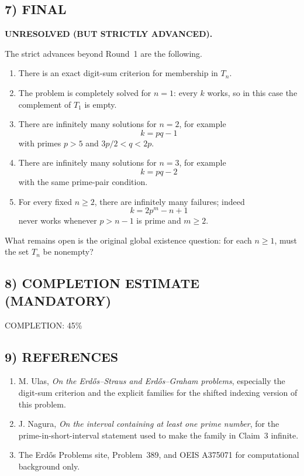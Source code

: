 \subsection*{7) FINAL}

\textbf{UNRESOLVED (BUT STRICTLY ADVANCED).}

The strict advances beyond Round~1 are the following.

\begin{enumerate}
\item There is an exact digit-sum criterion for membership in $T_n$.

\item The problem is completely solved for $n=1$: every $k$ works, so in this case the complement of $T_1$ is empty.

\item There are infinitely many solutions for $n=2$, for example
\[
k=pq-1
\]
with primes $p>5$ and $3p/2<q<2p$.

\item There are infinitely many solutions for $n=3$, for example
\[
k=pq-2
\]
with the same prime-pair condition.

\item For every fixed $n\ge 2$, there are infinitely many failures; indeed
\[
k=2p^m-n+1
\]
never works whenever $p>n-1$ is prime and $m\ge 2$.
\end{enumerate}

What remains open is the original global existence question:
for each $n\ge 1$, must the set $T_n$ be nonempty?

\subsection*{8) COMPLETION ESTIMATE (MANDATORY)}

COMPLETION: 45\%

\subsection*{9) REFERENCES}

\begin{enumerate}
\item M. Ulas, \emph{On the Erd\H{o}s--Straus and Erd\H{o}s--Graham problems}, especially the digit-sum criterion and the explicit families for the shifted indexing version of this problem.

\item J. Nagura, \emph{On the interval containing at least one prime number}, for the prime-in-short-interval statement used to make the family in Claim~3 infinite.

\item The Erd\H{o}s Problems site, Problem~389, and OEIS A375071 for computational background only.
\end{enumerate}



